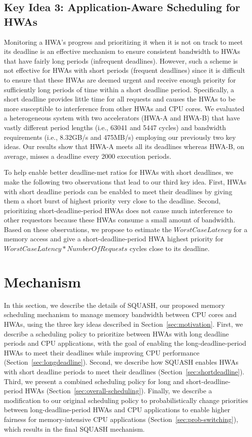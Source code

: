 \documentclass[10pt,letterpaper]{article}
\newcommand{\TMP}[1]{#1}
\begin{document}
\subsection{Key Idea 3: Application-Aware Scheduling for HWAs}
\label{sec:obs2}
\TMP{Monitoring a HWA's progress and prioritizing it when it is not on track to meet
its deadline is an effective mechanism to ensure consistent bandwidth to HWAs
that have fairly long periods (infrequent deadlines). However, such a scheme is
not effective for HWAs with short periods (frequent deadlines) since it is
difficult to ensure that these HWAs are deemed urgent and receive enough
priority for sufficiently long periods of time within a short deadline period.}
Specifically, a short deadline provides little time for all requests and
causes the HWAs to be more susceptible to interference from other HWAs and CPU
cores. We evaluated a heterogeneous system with two accelerators (HWA-A and
HWA-B) that have vastly different period lengths (i.e., 63041 and 5447 cycles)
and bandwidth requirements (i.e., 8.32GB/s and 475MB/s) employing our previously
two key ideas. Our results show that HWA-A meets all its deadlines whereas
HWA-B, on average, misses a deadline every 2000 execution periods.

To help enable better deadline-met ratios for HWAs with short deadlines, we make
the following two observations that lead to our third key idea. First, HWAs with
short deadline periods can be enabled to meet their deadlines by giving them a
short burst of highest priority very close to the deadline. Second, prioritizing
short-deadline-period HWAs does not cause much interference to other requestors
because these HWAs consume a small amount of
bandwidth. Based on these observations, we propose to estimate the
$\mathit{WorstCaseLatency}$ for a memory access and give a short-deadline-period HWA
highest priority for $\mathit{WorstCaseLatency*NumberOfRequests}$ cycles close to its
deadline.
 \section{Mechanism}

In this section, we describe the details of SQUASH, our proposed memory
scheduling mechanism to manage memory bandwidth between CPU cores and HWAs,
using the three key ideas described in Section~\ref{sec:motivation}.
First, we describe a scheduling policy to prioritize between HWAs with
long deadline periods and CPU applications, with the goal of enabling the
long-deadline-period HWAs to meet their deadlines while improving CPU
performance (Section~\ref{sec:longdeadline}). Second, we describe how SQUASH
enables HWAs with short deadline periods to meet their deadlines
(Section~\ref{sec:shortdeadline}). Third, we present a combined scheduling policy for
long and short-deadline-period HWAs (Section~\ref{sec:overall-scheduling}). Finally, we
 describe a modification to our original scheduling policy to
probabilistically change priorities between long-deadline-period HWAs and CPU
applications to enable higher fairness for memory-intensive CPU applications
(Section~\ref{sec:prob-switching}), which results in the final SQUASH mechanism.
\end{document}
